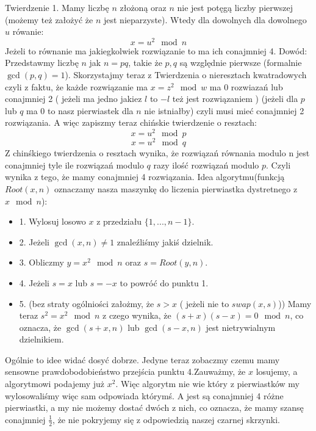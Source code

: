 Twierdzenie 1.\newline
Mamy liczbę $n$ złożoną oraz $n$ nie jest potęgą liczby pierwszej (możemy też założyć że $n$ jest nieparzyste). Wtedy dla dowolnych dla dowolnego $u$ rówanie:
$$x = u^2 \mod n$$
Jeżeli to równanie ma jakiegkolwiek rozwiązanie to ma ich conajmniej 4.\newline \newline
Dowód: \newline
Przedstawmy liczbę $n$ jak $n = pq$, takie że $p,q$ są względnie pierwsze (formalnie $\gcd(p,q) = 1$). Skorzystajmy teraz z Twierdzenia o nieresztach kwatradowych czyli z faktu, że każde rozwiązanie ma $x = z^2 \mod w$ ma 0 rozwiazań lub conajmniej 2 ( jeżeli ma jedno jakiez $l$ to $-l$ też jest rozwiązaniem ) (jeżeli dla $p$ lub $q$ ma 0 to nasz pierwiastek dla $n$ nie istniałby) czyli musi mieć conajmniej 2 rozwiązania. A więc zapiszmy teraz chińskie twierdzenie o resztach:
$$x = u^2 \mod p$$
$$x = u^2 \mod q$$
Z chinśkiego twierdzenia o resztach wynika, że rozwiązań równania modulo n jest conajmniej tyle ile rozwiązań modulo $q$ razy ilość rozwiązań modulo $p$. Czyli wynika z tego, że mamy conajmniej 4 rozwiązania.
\newline \newline
Idea algorytmu(funkcją $Root(x,n)$ oznaczamy nasza maszynkę do liczenia pierwiastka dystretnego z $x \mod n$): 
\begin{itemize}
    \item 1. Wylosuj losowo $x$ z przedziału $\{1,...,n-1\}$.
    \item 2. Jeżeli $\gcd(x,n) \neq 1$ znaleźliśmy jakiś dzielnik.
    \item 3. Obliczmy $y = x^2 \mod n$ oraz $s = Root(y,n)$.
    \item 4. Jeżeli $s = x$ lub $s = -x$ to powróć do punktu 1.
    \item 5. (bez straty ogólniości założmy, że $s > x$ ( jeżeli nie to $swap(x,s)$)) Mamy teraz $s^2 = x^2 \mod n$ z czego wynika, że $(s+x)(s-x) = 0 \mod n$, co oznacza, że $\gcd(s+x,n)$ lub $\gcd(s-x,n)$ jest nietrywialnym dzielnikiem. 
\end{itemize}

Ogólnie to idee widać dosyć dobrze. Jedyne teraz zobaczmy czemu mamy sensowne prawdobodobieństwo przejścia punktu 4.\newline Zauważmy, że $x$ losujemy, a algorytmowi podajemy już $x^2$. Więc algorytm nie wie który z pierwiastków my wylosowaliśmy więc sam odpowiada którymś. A jest są conajmniej 4 różne pierwiastki, a my nie możemy dostać dwóch z nich, co oznacza, że mamy szansę conajmniej $\frac{1}{2}$, że nie pokryjemy się z odpowiedzią naszej czarnej skrzynki. 